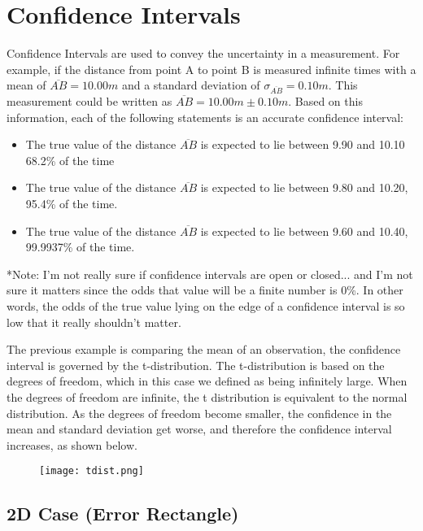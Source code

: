 \section{Confidence Intervals} 

Confidence Intervals are used to convey the uncertainty in a measurement.  For example, if the distance from point A to point B is measured infinite times with a mean of $\overline{AB} = 10.00m$ and a standard deviation of $\sigma_{\overline{AB}}= 0.10m$. This measurement could be written as $\overline{AB} = 10.00m \pm 0.10m$.  Based on this information, each of the following statements is an accurate confidence interval:
\begin{itemize}
	\item The true value of the distance $\overline{AB}$ is expected to lie between 9.90 and 10.10 68.2\% of the time
	\item The true value of the distance $\overline{AB}$ is expected to lie between 9.80 and 10.20, 95.4\% of the time.
	\item The true value of the distance $\overline{AB}$ is expected to lie between 9.60 and 10.40, 99.9937\% of the time.
\end{itemize}

*Note: I'm not really sure if confidence intervals are open or closed... and I'm not sure it matters since the odds that value will be a finite number is 0\%.  In other words, the odds of the true value lying on the edge of a confidence interval is so low that it really shouldn't matter.

The previous example is comparing the mean of an observation, the confidence interval is governed by the t-distribution.  The t-distribution is based on the degrees of freedom, which in this case we defined as being infinitely large.  When the degrees of freedom are infinite, the t distribution is equivalent to the normal distribution.  As the degrees of freedom become smaller, the confidence in the mean and standard deviation get worse, and therefore the confidence interval increases, as shown below.  

\begin{figure}[H]
	\centering
	\texttt{[image: tdist.png]}
\end{figure}

\subsection{2D Case (Error Rectangle)}